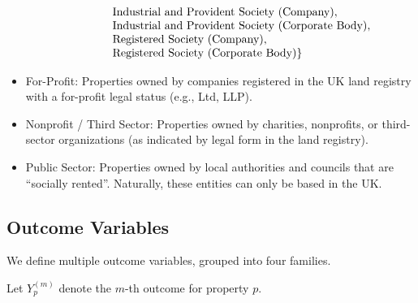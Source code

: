 \documentclass[12pt]{article}
\begin{document}
\[\begin{array}{@{}l l@{}}
&\hspace{4.4em}\text{Industrial and Provident Society (Company)},\\
&\hspace{4.4em}\text{Industrial and Provident Society (Corporate Body)},\\
&\hspace{4.4em}\text{Registered Society (Company)},\\
&\hspace{4.4em}\text{Registered Society (Corporate Body)}\}
\end{array}
\]
\fi
\begin{itemize}
    \item For-Profit: Properties owned by companies registered in the UK land registry with a for-profit legal status (e.g., Ltd, LLP).
    \item Nonprofit / Third Sector: Properties owned by  charities, nonprofits, or third-sector organizations (as indicated by legal form in the land registry).
    \item Public Sector: Properties owned by local authorities and councils that are ``socially rented''. Naturally, these entities can only be based in the UK.

    

\end{itemize}


\subsection{Outcome Variables}

We define multiple outcome variables, grouped into four families.

Let $Y^{(m)}_p$ denote the $m$-th outcome for property $p$.
\end{document}

